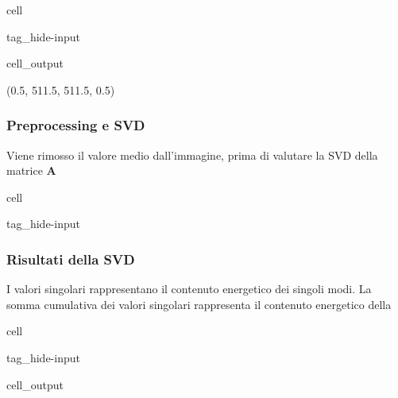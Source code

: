 \documentclass[letterpaper,10pt,italian]{jupyterBook}
\begin{document}
\begin{sphinxuseclass}{cell}
\begin{sphinxuseclass}{tag_hide-input}\begin{sphinxVerbatimOutput}

\begin{sphinxuseclass}{cell_output}
\begin{sphinxVerbatim}[commandchars=\\\{\}]
(\PYGZhy{}0.5, 511.5, 511.5, \PYGZhy{}0.5)
\end{sphinxVerbatim}

\noindent{}

\end{sphinxuseclass}\end{sphinxVerbatimOutput}

\end{sphinxuseclass}
\end{sphinxuseclass}

\subsubsection{Preprocessing e SVD}
\label{\detokenize{ch/ai/pca:preprocessing-e-svd}}
\sphinxAtStartPar
Viene rimosso il valore medio dall’immagine, prima di valutare la SVD della matrice \(\mathbf{A}\)

\begin{sphinxuseclass}{cell}
\begin{sphinxuseclass}{tag_hide-input}
\end{sphinxuseclass}
\end{sphinxuseclass}

\subsubsection{Risultati della SVD}
\label{\detokenize{ch/ai/pca:risultati-della-svd}}
\sphinxAtStartPar
I valori singolari rappresentano il contenuto energetico dei singoli modi. La somma cumulativa dei valori singolari rappresenta il contenuto energetico della

\begin{sphinxuseclass}{cell}
\begin{sphinxuseclass}{tag_hide-input}\begin{sphinxVerbatimOutput}

\begin{sphinxuseclass}{cell_output}
\noindent{}

\end{sphinxuseclass}\end{sphinxVerbatimOutput}

\end{sphinxuseclass}
\end{sphinxuseclass}
\end{document}
